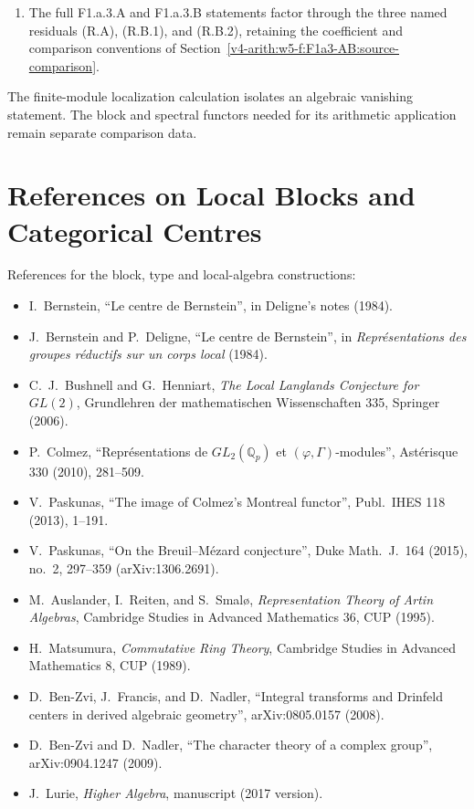\begin{enumerate}
factorisation for F1.a.3.A
(Proposition~\ref{v4-arith:w5-f:F1a3-AB:prop:A-residual-taxonomy}); (iii)
finite-module extension vanishing over a fraction field, with
conditional arithmetic transport
(Proposition~\ref{v4-arith:w5-f:F1a3-AB:prop:Ext1-generic-p5} and
Corollary~\ref{v4-arith:w5-f:F1a3-AB:cor:Ext1-zero-generic-locus});
(iv) the obstruction decomposition
(Proposition~\ref{v4-arith:w5-f:F1a3-AB:prop:F1a3-table-updated}).
\item The full F1.a.3.A and F1.a.3.B statements factor through the
three named residuals (R.A), (R.B.1), and (R.B.2), retaining the
coefficient and comparison conventions of
Section~\ref{v4-arith:w5-f:F1a3-AB:source-comparison}.
\end{enumerate}

The finite-module localization calculation isolates an algebraic
vanishing statement. The block and spectral functors needed for its
arithmetic application remain separate comparison data.

\section{References on Local Blocks and Categorical Centres}
\label{v4-arith:w5-f:F1a3-AB:bibliography}

References for the block, type and local-algebra constructions:

\begin{itemize}
\item I.~Bernstein, ``Le centre de Bernstein'', in Deligne's notes
(1984).
\item J.~Bernstein and P.~Deligne, ``Le centre de Bernstein'', in
\emph{Repr\'esentations des groupes r\'eductifs sur un corps local}
(1984).
\item C.~J.~Bushnell and G.~Henniart, \emph{The Local Langlands
Conjecture for \(GL(2)\)}, Grundlehren der mathematischen Wissenschaften
335, Springer (2006).
\item P.~Colmez, ``Repr\'esentations de \(GL_{2}(\mathbb{Q}_{p})\) et
\((\varphi,\Gamma)\)-modules'', Ast\'erisque 330 (2010), 281--509.
\item V.~Paskunas, ``The image of Colmez's Montreal functor'',
Publ.~IHES 118 (2013), 1--191.
\item V.~Paskunas, ``On the Breuil--M\'ezard conjecture'', Duke
Math.\ J.\ 164 (2015), no.\ 2, 297--359 (arXiv:1306.2691).
\item M.~Auslander, I.~Reiten, and S.~Smal\o{},
\emph{Representation Theory of Artin Algebras}, Cambridge Studies
in Advanced Mathematics 36, CUP (1995).
\item H.~Matsumura, \emph{Commutative Ring Theory}, Cambridge
Studies in Advanced Mathematics 8, CUP (1989).
\item D.~Ben-Zvi, J.~Francis, and D.~Nadler, ``Integral transforms
and Drinfeld centers in derived algebraic geometry'',
arXiv:0805.0157 (2008).
\item D.~Ben-Zvi and D.~Nadler, ``The character theory of a complex
group'', arXiv:0904.1247 (2009).
\item J.~Lurie, \emph{Higher Algebra}, manuscript (2017 version).
\end{itemize}

